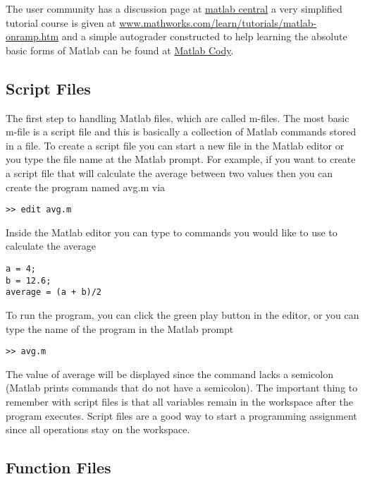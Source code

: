 \documentclass[twoside]{article}
\begin{document}
The user community has a discussion page at \href{https://www.mathworks.com/matlabcentral/}{matlab central} a very simplified tutorial course is given at
\href{https://www.mathworks.com/learn/tutorials/matlab-onramp.html} {www.mathworks.com/learn/tutorials/matlab-onramp.htm} and a simple autograder constructed to help learning the absolute basic forms of Matlab can be found at \href{https://www.mathworks.com/matlabcentral/cody/}{Matlab Cody}.


\subsection{Script Files}

The first step to handling Matlab files, which are called m-files. The most basic m-file is a script file and this is basically a collection of Matlab commands stored in a file. To create a script file you can start a new file in the Matlab editor or you type the file name at the Matlab prompt. For example, if you want to create a script file that will calculate the average between two values then you can create the program named avg.m via
\begin{verbatim}
>> edit avg.m
\end{verbatim}

Inside the Matlab editor you can type to commands you would like to use to calculate the average
\begin{verbatim}
a = 4;
b = 12.6;
average = (a + b)/2
\end{verbatim}
To run the program, you can click the green play button in the editor, or you can type the name of the program in the Matlab prompt
\begin{verbatim}
>> avg.m
\end{verbatim}
The value of average will be displayed since the command lacks a semicolon (Matlab prints commands that do not have a semicolon). The important thing to remember with script files is that all variables remain in the workspace after the program executes. Script files are a good way to start a programming assignment since all operations stay on the workspace. 

\subsection{Function Files}
\end{document}
